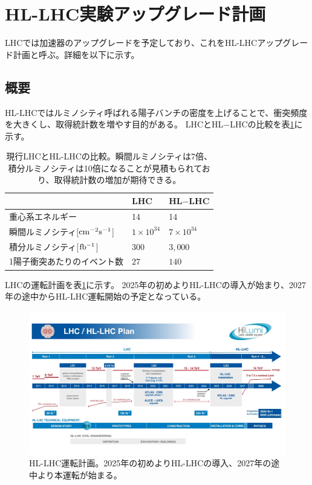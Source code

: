 \clearpage
\section{HL-LHC実験アップグレード計画}
LHCでは加速器のアップグレードを予定しており、これをHL-LHCアップグレード計画と呼ぶ。詳細を以下に示す。
\subsection{概要}
HL-LHCではルミノシティ呼ばれる陽子バンチの密度を上げることで、衝突頻度を大きくし、取得統計数を増やす目的がある。
LHCとHL$-$LHCの比較を表\ref{compare_lhc}に示す。

\begin{table}[tbp]
\begin{center}
\caption[現行LHCとHL-LHCの比較]{現行LHCとHL-LHCの比較\cite{1-6}。瞬間ルミノシティは7倍、積分ルミノシティは10倍になることが見積もられており、取得統計数の増加が期待できる。}
\label{compare_lhc}
  \begin{tabular}{|lll|} \hline
    & LHC & HL$-$LHC \\ \hline
    重心系エネルギー & 14 & 14 \\
    瞬間ルミノシティ[$\rm{cm^{-2}s^{-1}}$] & $1\times 10^{34}$ & $7\times10^{34}$ \\
    積分ルミノシティ[$\rm{fb^{-1}}$] & $300$ & $3,000$ \\
    1陽子衝突あたりのイベント数 & $27$ & $140$ \\ \hline 
  \end{tabular}
\end{center}
\end{table}

LHCの運転計画を表\ref{hllhc_plan}に示す。
2025年の初めよりHL-LHCの導入が始まり、2027年の途中からHL-LHC運転開始の予定となっている。
\begin{figure}[bpt]\centering
\includegraphics[width=12cm]{./hllhc_plan.jpg}
\caption[HL-LHC運転計画]{HL-LHC運転計画\cite{1-7}。2025年の初めよりHL-LHCの導入、2027年の途中より本運転が始まる。}
\label{hllhc_plan}
\end{figure}

